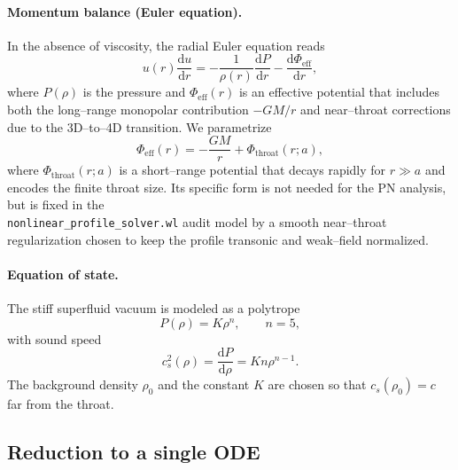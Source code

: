 \documentclass[11pt]{article}
\begin{document}
\paragraph{Momentum balance (Euler equation).}
In the absence of viscosity, the radial Euler equation reads
\begin{equation}
  u(r) \frac{\mathrm{d}u}{\mathrm{d}r}
  = -\frac{1}{\rho(r)} \frac{\mathrm{d}P}{\mathrm{d}r}
    - \frac{\mathrm{d}\Phi_{\text{eff}}}{\mathrm{d}r},
  \label{eq:inflow-euler}
\end{equation}
where \(P(\rho)\) is the pressure and \(\Phi_{\text{eff}}(r)\) is an
effective potential that includes both the long--range monopolar
contribution \(-G M / r\) and near--throat corrections due to the 3D--to--4D
transition.  We parametrize
\begin{equation}
  \Phi_{\text{eff}}(r)
  = -\frac{G M}{r} + \Phi_{\text{throat}}(r; a),
  \label{eq:Phi-eff-def}
\end{equation}
where \(\Phi_{\text{throat}}(r; a)\) is a short--range potential that
decays rapidly for \(r \gg a\) and encodes the finite throat size.  Its
specific form is not needed for the PN analysis, but is fixed in the\\
\texttt{nonlinear\_profile\_solver.wl} audit model by a smooth near--throat
regularization chosen to keep the profile transonic and weak--field
normalized.

\paragraph{Equation of state.}
The stiff superfluid vacuum is modeled as a polytrope
\begin{equation}
  P(\rho) = K \rho^n,
  \qquad
  n = 5,
\end{equation}
with sound speed
\begin{equation}
  c_s^2(\rho) = \frac{\mathrm{d}P}{\mathrm{d}\rho}
  = K n \rho^{n-1}.
\end{equation}
The background density \(\rho_0\) and the constant \(K\) are chosen so that
\(c_s(\rho_0) = c\) far from the throat.

\subsection{Reduction to a single ODE}
\label{app:inflow-ode}
\end{document}
